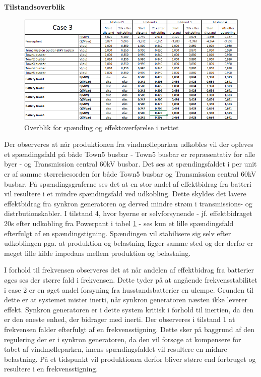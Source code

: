 \textbf{Tilstandsoverblik}
\begin{figure}[H] %
	\centering
	\includegraphics[width=1\textwidth]{figurer/LargeDisturbance/Overview}
	\caption{Overblik for spænding og effektoverførelse i nettet}
	\label{fig:C3Overview}
\end{figure}

Der observeres at når produktionen fra vindmølleparken udkobles vil der opleves et spændingsfald på både Town5 busbar - Town5 busbar er repræsentativ for alle byer - og Transmission central 60kV busbar. Det ses at spændingsfaldet i per unit er af samme størrelsesorden for både Town5 busbar og Transmission central 60kV busbar. På spændingsgraferne ses det at en stor andel af effektbidrag fra batteri vil resultere i et mindre spændingsfald ved udkobling. Dette skyldes det lavere effektbidrag fra synkron generatoren og derved mindre strøm i transmissions- og distrbutionskabler. I tilstand 4, hvor byerne er selvforsynende - jf. effektbidraget 20s efter udkobling fra Powerpant i tabel \ref{fig:C3Overview} -  ses kun et lille spændingsfald efterfulgt af en spændingstigning. Spændingen vil stabilisere sig selv efter udkoblingen pga. at produktion og belastning ligger samme sted og der derfor er meget lille kilde impedans mellem produktion og belastning.

I forhold til frekvensen observeres det at når andelen af effektbidrag fra batterier øges ses der større fald i frekvensen. Dette tyder på at angående frekvensstabilitet i case 2 er en øget andel forsyning fra husstandsbatterier en ulempe. Grunden til dette er at systemet mister inerti, når synkron generatoren næsten ikke leverer effekt. Synkron generatoren er i dette system kritisk i forhold til inertien, da den er den eneste enhed, der bidrager med inerti. Der observeres i tilstand 1 at frekvensen falder efterfulgt af en frekvensstigning. Dette sker på baggrund af den regulering der er i synkron generatoren, da den vil forsøge at kompensere for tabet af vindmølleparken, imens spændingsfaldet vil resultere en midnre belastning. På et tidspunkt vil produktionen derfor bliver større end forbruget og resultere i en frekvensstigning.
